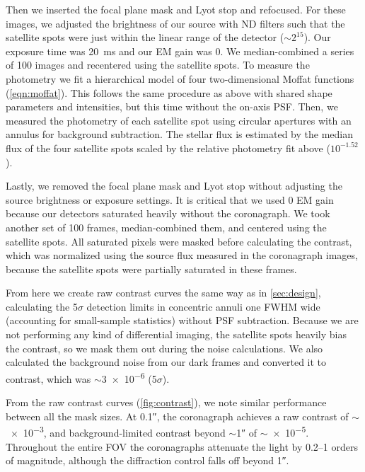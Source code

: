 \documentclass[]{spie}  %
\begin{document}
Then we inserted the focal plane mask and Lyot stop and refocused. For these images, we adjusted the brightness of our source with ND filters such that the satellite spots were just within the linear range of the detector ($\sim2^15$). Our exposure time was \qty{20}{\milli\second} and our EM gain was 0. We median-combined a series of 100 images and recentered using the satellite spots. To measure the photometry we fit a hierarchical model of four two-dimensional Moffat functions (\autoref{eqn:moffat}). This follows the same procedure as above with shared shape parameters and intensities, but this time without the on-axis PSF. Then, we measured the photometry of each satellite spot using circular apertures with an annulus for background subtraction. The stellar flux is estimated by the median flux of the four satellite spots scaled by the relative photometry fit above ($10^{-1.52}$).

Lastly, we removed the focal plane mask and Lyot stop without adjusting the source brightness or exposure settings. It is critical that we used 0 EM gain because our detectors saturated heavily without the coronagraph. We took another set of 100 frames, median-combined them, and centered using the satellite spots. All saturated pixels were masked before calculating the contrast, which was normalized using the source flux measured in the coronagraph images, because the satellite spots were partially saturated in these frames.

From here we create raw contrast curves the same way as in \autoref{sec:design}, calculating the 5$\sigma$ detection limits in concentric annuli one FWHM wide (accounting for small-sample statistics\cite{mawet2014}) without PSF subtraction. Because we are not performing any kind of differential imaging, the satellite spots heavily bias the contrast, so we mask them out during the noise calculations. We also calculated the background noise from our dark frames and converted it to contrast, which was $\sim$\num{3e-6} (5$\sigma$).

From the raw contrast curves (\autoref{fig:contrast}), we note similar performance between all the mask sizes. At \ang{;;0.1}, the coronagraph achieves a raw contrast of $\sim$ \num{e-3}, and background-limited contrast beyond $\sim$\ang{;;1} of $\sim$\num{e-5}. Throughout the entire FOV the coronagraphs attenuate the light by \numrange{0.2}{1} orders of magnitude, although the diffraction control falls off beyond \ang{;;1}.
\end{document}
